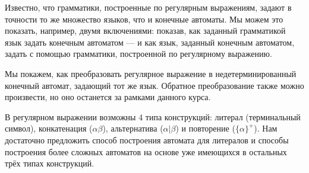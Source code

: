 \documentclass[12pt,a4paper,oneside]{article}
\begin{document}
Известно, что грамматики, построенные по регулярным выражениям, задают в точности то же 
множество языков, что и конечные автоматы.
Мы можем это показать, например, двумя включениями: показав, как заданный грамматикой язык
задать конечным автоматом --- и как язык, заданный конечным автоматом, задать с помощью 
грамматики, построенной по регулярному выражению.

Мы покажем, как преобразовать регулярное выражение в недетерминированный конечный автомат, задающий 
тот же язык. 
Обратное преобразование также можно произвести, но оно останется за рамками данного курса.

В регулярном выражении возможны 4 типа конструкций: литерал (терминальный символ),
конкатенация ($\alpha\beta$), альтернатива ($\alpha|\beta$)
и повторение ($\{\alpha\}^+$). Нам достаточно предложить способ построения автомата для
литералов и способы построения более сложных автоматов на основе уже имеющихся в остальных 
трёх типах конструкций. 
\end{document}
